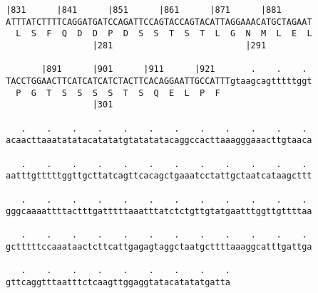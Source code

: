 \documentclass{article}
\begin{document}
\newpage
\begin{Verbatim}[fontfamily=courier]
       |831      |841      |851      |861      |871      |881
ATTTATCTTTTCAGGATGATCCAGATTCCAGTACCAGTACATTAGGAAACATGCTAGAAT
  L  S  F  Q  D  D  P  D  S  S  T  S  T  L  G  N  M  L  E  L
                 |281                          |291         

       |891      |901      |911      |921       .    .    . 
TACCTGGAACTTCATCATCATCTACTTCACAGGAATTGCCATTTgtaagcagtttttggt
  P  G  T  S  S  S  S  T  S  Q  E  L  P  F                  
                 |301                                       

   .    .    .    .    .    .    .    .    .    .    .    . 
acaacttaaatatatacatatatgtatatatacaggccacttaaagggaaacttgtaaca

   .    .    .    .    .    .    .    .    .    .    .    . 
aatttgtttttggttgcttatcagttcacagctgaaatcctattgctaatcataagcttt

   .    .    .    .    .    .    .    .    .    .    .    . 
gggcaaaattttactttgatttttaaatttatctctgttgtatgaatttggttgttttaa

   .    .    .    .    .    .    .    .    .    .    .    . 
gctttttccaaataactcttcattgagagtaggctaatgcttttaaaggcatttgattga

   .    .    .    .    .    .    .    .    .
gttcaggtttaatttctcaagttggaggtatacatatatgatta
\end{Verbatim}
\newpage
\end{document}
